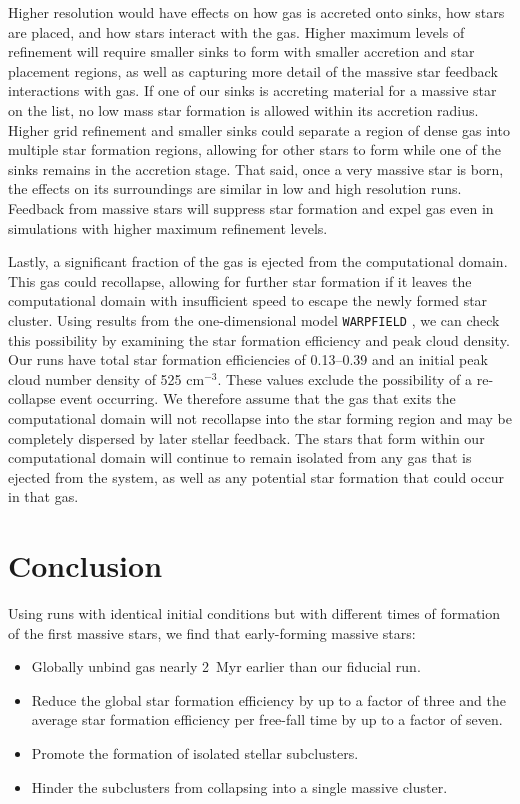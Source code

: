 \documentclass[twoside]{drexel-thesis}
\begin{document}
\begin{thesis}
Higher resolution would have effects on how gas is accreted onto sinks, how stars are placed, and how stars interact with the gas. Higher maximum levels of refinement will require smaller sinks to form with smaller accretion and star placement regions, as well as capturing more detail of the massive star feedback interactions with gas. If one of our sinks is accreting material for a massive star on the list, no low mass star formation is allowed within its accretion radius. Higher grid refinement and smaller sinks could separate a region of dense gas into multiple star formation regions, allowing for other stars to form while one of the sinks remains in the accretion stage.  That said, once a very massive star is born, the effects on its surroundings are similar in low and high resolution runs. Feedback from massive stars will suppress star formation and expel gas even in simulations with higher maximum refinement levels.

Lastly, a significant fraction of the gas is ejected from the computational domain. This gas could recollapse, allowing for further star formation if it
leaves the computational domain with insufficient speed to escape the newly formed star cluster. Using results from the one-dimensional model \texttt{WARPFIELD} \citep{rahner_forming_2018}, we can check this possibility by examining the star formation efficiency and peak cloud density. Our runs have total star formation efficiencies of 0.13--0.39 and an initial peak cloud number density of 525 cm$^{-3}$.  These values exclude the possibility of a re-collapse event occurring.
We therefore assume that the gas that exits the computational domain will not recollapse into the star forming region and may be completely dispersed by later stellar feedback. The stars that form within our computational domain will continue to remain isolated from any gas that is ejected from the system, as well as any potential star formation that could occur in that gas.

\section{Conclusion}\label{sec:p1-conclusion}
Using runs with identical initial conditions but with different times of formation of the first massive stars, we find that early-forming massive stars:
\begin{itemize}
    \item Globally unbind gas nearly 2~Myr earlier than our fiducial run.
    \item Reduce the global star formation efficiency by up to a factor of three and the average star formation efficiency per free-fall time by up to a factor of seven.
    \item Promote the formation of isolated stellar subclusters.
    \item Hinder the subclusters from collapsing into a single massive cluster.
\end{itemize}


\end{thesis}
\end{document}
